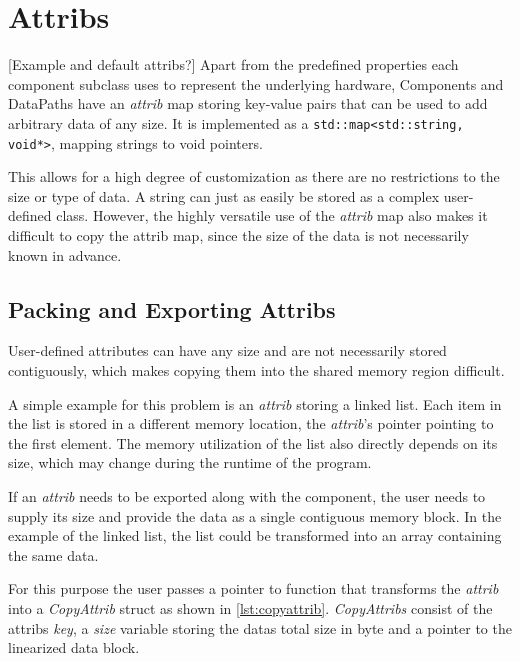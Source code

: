 \section{Attribs}
[Example and default attribs?] %
Apart from the predefined properties each component subclass uses to represent the underlying hardware, Components and DataPaths have an \emph{attrib} map storing key-value pairs that can be used to add arbitrary data of any size.
It is implemented as a \lstinline{std::map<std::string, void*>}, mapping strings to void pointers.

This allows for a high degree of customization as there are no restrictions to the size or type of data. A string can just as easily be stored as a complex user-defined class.
However, the highly versatile use of the \emph{attrib} map also makes it difficult to copy the attrib map, since the size of the data is not necessarily known in advance.

\subsection{Packing and Exporting Attribs}\label{subsection:packing_and_exporting}
User-defined attributes can have any size and are not necessarily stored contiguously, which makes copying them into the shared memory region difficult.

A simple example for this problem is an \emph{attrib} storing a linked list. Each item in the list is stored in a different memory location,
the \emph{attrib}'s pointer pointing to the first element. The memory utilization of the list also directly depends on its size, which may change during the runtime of the program.

If an \emph{attrib} needs to be exported along with the component, the user needs to supply its size and provide the data as a single contiguous memory block.
In the example of the linked list, the list could be transformed into an array containing the same data.

For this purpose the user passes a pointer to function that transforms the \emph{attrib} into a \emph{CopyAttrib} struct as shown in \autoref{lst:copyattrib}.
\emph{CopyAttribs} consist of the attribs \emph{key}, a \emph{size} variable storing the datas total size in byte and a pointer to the linearized data block.

